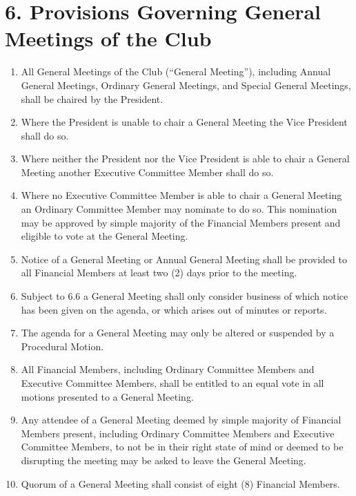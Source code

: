 \documentclass[12pt]{article}
\begin{document}
\section{6. Provisions Governing General Meetings of the Club}
\begin{enumerate}[label=6.\arabic*]
\item All General Meetings of the Club (“General Meeting”), including Annual General Meetings, Ordinary General Meetings, and Special General Meetings, shall be chaired by the President.
\item Where the President is unable to chair a General Meeting the Vice President shall do so.
\item Where neither the President nor the Vice President is able to chair a General Meeting another Executive Committee Member shall do so.
\item Where no Executive Committee Member is able to chair a General Meeting an Ordinary Committee Member may nominate to do so. This nomination may be approved by simple majority of the Financial Members present and eligible to vote at the General Meeting.
\item Notice of a General Meeting or Annual General Meeting shall be provided to all Financial Members at least two (2) days prior to the meeting.
\item Subject to 6.6 a General Meeting shall only consider business of which notice has been given on the agenda, or which arises out of minutes or reports.
\item The agenda for a General Meeting may only be altered or suspended by a Procedural Motion.
\item All Financial Members, including Ordinary Committee Members and Executive Committee Members, shall be entitled to an equal vote in all motions presented to a General Meeting.
\item Any attendee of a General Meeting deemed by simple majority of Financial Members present, including Ordinary Committee Members and Executive Committee Members, to not be in their right state of mind or deemed to be disrupting the meeting may be asked to leave the General Meeting.
\item Quorum of a General Meeting shall consist of eight (8) Financial Members.
\end{enumerate}
\end{document}
